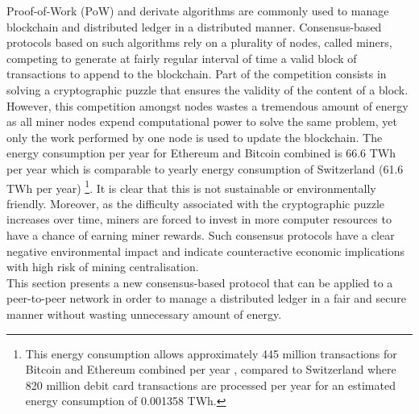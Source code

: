 Proof-of-Work (PoW) and derivate algorithms are commonly used to manage blockchain and distributed ledger in a distributed manner. Consensus-based protocols based on such algorithms rely on a plurality of nodes, called miners, competing to generate at fairly regular interval of time a valid block of transactions to append to the blockchain. Part of the competition consists in solving a cryptographic puzzle that ensures the validity of the content of a block. \\

However, this competition amongst nodes wastes a tremendous amount of energy as all miner nodes expend computational power to solve the same problem, yet only the work performed by one node is used to update the blockchain. The energy consumption per year for Ethereum and Bitcoin combined is 66.6 TWh per year which is comparable to yearly energy consumption of Switzerland (61.6 TWh per year) \cite{electric}\footnote{This energy consumption allows approximately 445 million transactions for Bitcoin and Ethereum combined per year \cite{BitTxpD}\cite{EthTxpD}, compared to Switzerland where 820 million debit card transactions are processed per year \cite{swis} for an estimated energy consumption of 0.001358 TWh.}. It is clear that this is not sustainable or environmentally friendly. Moreover, as the difficulty associated with the cryptographic puzzle increases over time, miners are forced to invest in more computer resources to have a chance of earning miner rewards. Such consensus protocols have a clear negative environmental impact and indicate counteractive economic implications with high risk of mining centralisation. \\

This section presents a new consensus-based protocol that can be applied to a peer-to-peer network in order to manage a distributed ledger in a fair and secure manner without wasting unnecessary amount of energy. 